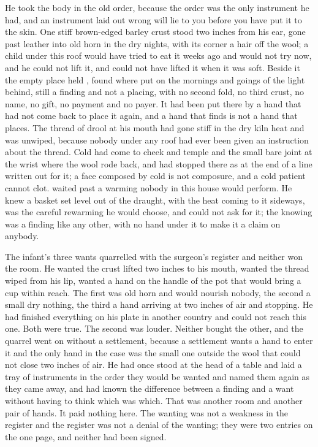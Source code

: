 He took the body in the old order, because the order was the only instrument he had, and an instrument laid out wrong will lie to you before you have put it to the skin. One stiff brown-edged barley crust stood two inches from his ear, gone past leather into old horn in the dry nights, with its corner a hair off the wool; a child under this roof would have tried to eat it weeks ago and would not try now, and he could not lift it, and could not have lifted it when it was soft. Beside it the empty place held , found where put on the mornings and goings of the light behind, still a finding and not a placing, with no second fold, no third crust, no name, no gift, no payment and no payer. It had been put there by a hand that had not come back to place it again, and a hand that finds is not a hand that places. The thread of drool at his mouth had gone stiff in the dry kiln heat and was unwiped, because nobody under any roof had ever been given an instruction about the thread. Cold had come to cheek and temple and the small bare joint at the wrist where the wool rode back, and had stopped there as at the end of a line written out for it; a face composed by cold is not composure, and a cold patient cannot clot.  waited past a warming nobody in this house would perform. He knew a basket set level out of the draught, with the heat coming to it sideways, was the careful rewarming he would choose, and could not ask for it; the knowing was a finding like any other, with no hand under it to make it a claim on anybody.

The infant's three wants quarrelled with the surgeon's register and neither won the room. He wanted the crust lifted two inches to his mouth, wanted the thread wiped from his lip, wanted a hand on the handle of the pot that would bring a cup within reach. The first was old horn and would nourish nobody, the second a small dry nothing, the third a hand arriving at two inches of air and stopping. He had finished everything on his plate in another country and could not reach this one. Both were true. The second was louder. Neither bought the other, and the quarrel went on without a settlement, because a settlement wants a hand to enter it and the only hand in the case was the small one outside the wool that could not close two inches of air. He had once stood at the head of a table and laid a tray of instruments in the order they would be wanted and named them again as they came away, and had known the difference between a finding and a want without having to think which was which. That was another room and another pair of hands. It paid nothing here. The wanting was not a weakness in the register and the register was not a denial of the wanting; they were two entries on the one page, and neither had been signed.

